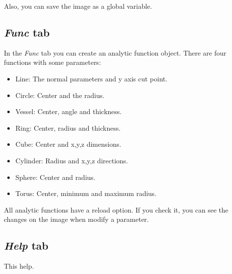 \documentclass{article}
\begin{document}
Also, you can save the image as a global variable.

\subsection{\emph{Func} tab}
In the \emph{Func} tab you can create an analytic function object. There are four functions with some parameters:
\begin{itemize}
	\item Line: The normal parameters and y axis cut point.
	\item Circle: Center and the radius.
	\item Vessel: Center, angle and thickness.
	\item Ring: Center, radius and thickness.
	\item Cube: Center and x,y,z dimensions.
	\item Cylinder: Radius and x,y,z directions.
	\item Sphere: Center and radius.
	\item Torus: Center, minimum and maximum radius.
\end{itemize}

All analytic functions have a reload option. If you check it, you can see the changes on the image when modify a parameter.

\subsection{\emph{Help} tab}
This help.
\end{document}
